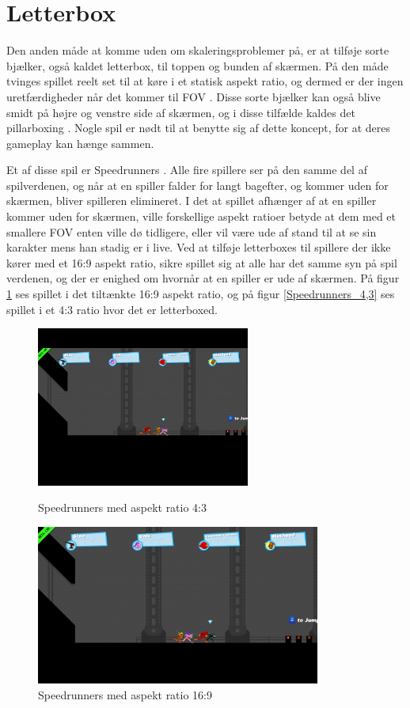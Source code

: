\documentclass[Main.tex]{AspectRatio.tex}
\begin{document}
\section{Letterbox}

Den anden måde at komme uden om skaleringsproblemer på, er at tilføje sorte bjælker, også kaldet letterbox, til toppen og bunden af skærmen. På den måde tvinges spillet reelt set til at køre i et statisk aspekt ratio, og dermed er der ingen uretfærdigheder når det kommer til FOV \cite{computerhope}. Disse sorte bjælker kan også blive smidt på højre og venstre side af skærmen, og i disse tilfælde kaldes det pillarboxing \cite{Apple}. Nogle spil er nødt til at benytte sig af dette koncept, for at deres gameplay kan hænge sammen.

Et af disse spil er Speedrunners \cite{SpeedrunnersGame}. Alle fire spillere ser på den samme del af spilverdenen, og når at en spiller falder for langt bagefter, og kommer uden for skærmen, bliver spilleren elimineret. I det at spillet afhænger af at en spiller kommer uden for skærmen, ville forskellige aspekt ratioer betyde at dem med et smallere FOV enten ville dø tidligere, eller vil være ude af stand til at se sin karakter mens han stadig er i live. Ved at tilføje letterboxes til spillere der ikke kører med et 16:9 aspekt ratio, sikre spillet sig at alle har det samme syn på spil verdenen, og der er enighed om hvornår at en spiller er ude af skærmen. På figur \ref{Speedrunners_16,9} ses spillet i det tiltænkte 16:9 aspekt ratio, og på figur \ref{Speedrunners_4,3} ses spillet i et 4:3 ratio hvor det er letterboxed.

\begin{figure}[h]
\centering
\parbox{7cm}{
\includegraphics[width = 7cm]{billeder/Speedrunners_4,3}
\caption{Speedrunners med aspekt ratio 4:3}    
\label{Speedrunners_4,3}}
\qquad
\begin{minipage}{9.33cm}
\includegraphics[width = 9.33cm]{billeder/Speedrunners_16,9}
\caption{Speedrunners med aspekt ratio 16:9}    
\label{Speedrunners_16,9}
\end{minipage}
\end{figure}
\end{document}

